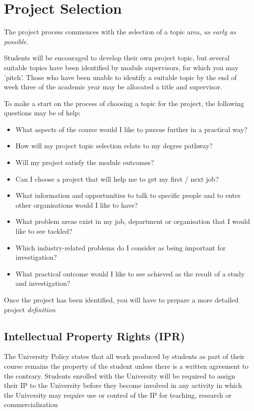 \chapter{Project Selection}

The project process commences with the selection of a topic area, \textit{as early as possible}.

\begin{tcolorbox}
    Students will be encouraged to develop their own project topic, but several suitable topics have been identified by module supervisors, for which you may 'pitch’. Those who have been unable to identify a suitable topic by the end of week three of the academic year may be allocated a title and supervisor.
\end{tcolorbox}
    
To make a start on the process of choosing a topic for the project, the following questions may be of help:

\begin{itemize}
    \item What aspects of the course would I like to pursue further in a practical way?
    \item How will my project topic selection relate to my degree pathway?
    \item Will my project satisfy the module outcomes?
    \item Can I choose a project that will help me to get my first / next job?
    \item What information and opportunities to talk to specific people and to enter other organisations would I like to have?
    \item What problem areas exist in my job, department or organisation that I would like to see tackled?
    \item Which industry-related problems do I consider as being important for investigation?
    \item What practical outcome would I like to see achieved as the result of a study and investigation?
\end{itemize}

Once the project has been identified, you will have to prepare a more detailed project \textit{definition}

\section{Intellectual Property Rights (IPR)}

The University Policy states that all work produced by students as part of their course remains the property of the student unless there is a written agreement to the contrary. Students enrolled with the University will be required to assign their IP to the University before they become involved in any activity in which the University may require use or control of the IP for teaching, research or commercialisation

